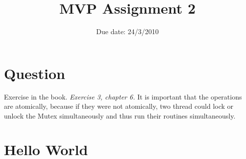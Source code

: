 \documentclass{article}
\title{MVP Assignment 2}
\date{Due date: 24/3/2010}
\begin{document}
\maketitle

\newcommand{\question}[1]{#1}
\newcommand{\answer}[1]{}


%
%
\answer{
\begin{flushleft}
{\bf Group room:} FIXME\\
{\bf Group number:} FIXME
\end{flushleft}
}

\section{Question}

\begin{ExerciseList}
\Exercise Exercise in the book.
\Question \emph{Exercise 3, chapter 6.}
\Answer It is important that the operations are atomically, because if they were not atomically, two thread could lock or unlock the Mutex simultaneously and thus run their routines simultaneously.

\end{ExerciseList}

\section{Hello World}
\end{document}
